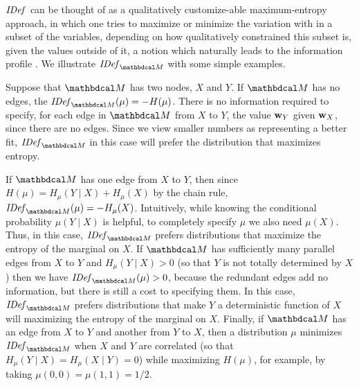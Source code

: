 \documentclass{article}
\begin{document}
	
	$\mathit{IDef}_{}$ can be thought of as a qualitatively customize-able maximum-entropy \cite{Jaynes57} approach, in which one tries to maximize or minimize the variation with in a subset of the variables, depending on how qualitatively constrained this subset is, given the values outside of it, a notion which naturally leads to the information profile . We illustrate $\IDef{\dg M}$ with some simple examples.  


	\begin{example}
	Suppose that $\dg M$ has two nodes, $X$ and $Y$. If $\dg M$ has no edges, the $\IDef{\dg M}(\mu) = - H(\mu)$.
	There is no information required to specify, for each edge in ${\dg M}$ from $X$ to $Y$, the value ${\mathbf w}_Y$ given ${\mathbf w}_X$, since there are no edges. Since we view smaller numbers as representing a better fit, $\IDef{\dg M}$ in this case will prefer the distribution that maximizes entropy.

	If $\dg M$ has one edge from $X$ to $Y$, then since $H(\mu) = H_{\mu}(Y \mid X) + H_\mu(X)$ by the chain rule, $\IDef{\dg M}(\mu) = -H_{\mu}(X)$. Intuitively, while knowing the conditional probability $\mu(Y \mid X)$ is helpful, to completely specify $\mu$ we also need $\mu(X)$. Thus, in this case, $\IDef{\dg M}$ prefers distributions that maximize the entropy of the marginal on $X$. If $\dg M$ has sufficiently many parallel edges
	from $X$ to $Y$ and $H_{\mu}(Y \mid X) > 0$ (so that $Y$ is not totally determined by $X$) then we have $\IDef{\dg M}(\mu) > 0$, because the redundant edges add no information, but there is still a cost to specifying them. In this case, $\IDef{\dg M}$ prefers distributions that make $Y$ a deterministic function of $X$ will maximizing the entropy of the marginal on $X$. Finally, if ${\dg M}$ has an edge from $X$ to $Y$ and another from $Y$
	to $X$, then a distribution $\mu$ minimizes $\IDef{\dg M}$ when 
	$X$ and $Y$ are correlated (so that $H_\mu(Y \mid X) = H_\mu(X \mid Y) = 0$) while
	maximizing $H(\mu)$, for example, by taking $\mu(0,0) = \mu(1,1) = 1/2$.
	\end{example}
\end{document}
